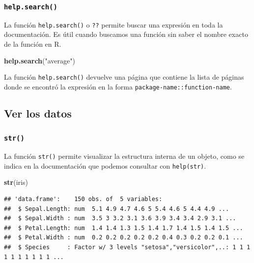 \documentclass[
]{book}
\newenvironment{Shaded}{\begin{snugshade}}{\end{snugshade}}
\newcommand{\KeywordTok}[1]{\textcolor[rgb]{0.13,0.29,0.53}{\textbf{#1}}}
\newcommand{\NormalTok}[1]{#1}
\newcommand{\StringTok}[1]{\textcolor[rgb]{0.31,0.60,0.02}{#1}}
\begin{document}
\hypertarget{l015helpsearch}{%
\subsubsection{\texorpdfstring{\texttt{help.search()}}{help.search()}}\label{l015helpsearch}}

La función \texttt{help.search()} o \texttt{??} permite buscar una expresión en toda la documentación. Es útil cuando buscamos una función sin saber el nombre exacto de la función en R.

\begin{Shaded}
\begin{Highlighting}[]
\KeywordTok{help.search}\NormalTok{(}\StringTok{"average"}\NormalTok{)}
\end{Highlighting}
\end{Shaded}

La función \texttt{help.search()} devuelve una página que contiene la lista de páginas donde se encontró la expresión en la forma \texttt{package-name::function-name}.

\hypertarget{ver-los-datos}{%
\subsection{Ver los datos}\label{ver-los-datos}}

\hypertarget{l015str}{%
\subsubsection{\texorpdfstring{\texttt{str()}}{str()}}\label{l015str}}

La función \texttt{str()} permite visualizar la estructura interna de un objeto, como se indica en la documentación que podemos consultar con \texttt{help(str)}.

\begin{Shaded}
\begin{Highlighting}[]
\KeywordTok{str}\NormalTok{(iris)}
\end{Highlighting}
\end{Shaded}

\begin{verbatim}
## 'data.frame':    150 obs. of  5 variables:
##  $ Sepal.Length: num  5.1 4.9 4.7 4.6 5 5.4 4.6 5 4.4 4.9 ...
##  $ Sepal.Width : num  3.5 3 3.2 3.1 3.6 3.9 3.4 3.4 2.9 3.1 ...
##  $ Petal.Length: num  1.4 1.4 1.3 1.5 1.4 1.7 1.4 1.5 1.4 1.5 ...
##  $ Petal.Width : num  0.2 0.2 0.2 0.2 0.2 0.4 0.3 0.2 0.2 0.1 ...
##  $ Species     : Factor w/ 3 levels "setosa","versicolor",..: 1 1 1 1 1 1 1 1 1 1 ...
\end{verbatim}
\end{document}
